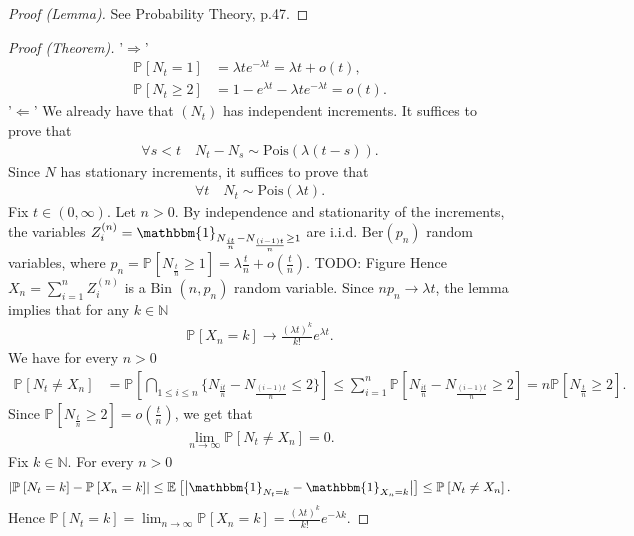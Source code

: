 \begin{proof}[Proof (Lemma)]
	See Probability Theory, p.47.
\end{proof}
\begin{proof}[Proof (Theorem)]
'$\Longrightarrow$' 
\begin{align}
	\mathbb{P}_{} \left[ N_t=1 \right] &= \lambda t e^{-\lambda t} = \lambda t + o(t),\\
	\mathbb{P}_{} \left[ N_t \geq 2 \right] &= 1 - e^{\lambda t} - \lambda t e^{-\lambda t} = o(t).
\end{align}
'$\Longleftarrow$'
We already have that $(N_t)$ has independent increments. It suffices to prove that 
\begin{align}
	\forall s<t \quad N_t - N_s \sim  \textrm{Pois} (\lambda (t-s)).
\end{align}
Since $N$ has stationary increments, it suffices to prove that
\begin{align}
	\forall t \quad N_t \sim  \textrm{Pois} (\lambda t).
\end{align}
Fix $t\in(0,\infty )$. Let $n> 0$. By independence and stationarity of the increments, the variables $Z_i^{(n)}=\mathbbm{1}_{N_{\frac{it}{n}}- N_{\frac{(i-1)t}{n}}\geq 1} $ are i.i.d. $ \textrm{Ber}(p_n)$ random variables, where $p_n = \mathbb{P}_{} \left[ N_{\frac{t}{n}}\geq 1 \right] = \lambda \frac{t}{n} + o\left(\frac{t}{n}\right)$. 
{\color{blue}TODO: Figure}
Hence $X_n = \sum_{i=1}^{n} Z_i^{(n)}$ is a $ \textrm{Bin } (n, p_n)$ random variable. Since $np_n \to \lambda t$, the lemma implies that for any $k \in \mathbb{N}$ 
\begin{align}
	\mathbb{P}_{} \left[ X_n =k \right] \to \frac{(\lambda t)^{k}}{k!}e^{\lambda t}.
\end{align}
We have for every $n> 0$ 
\begin{align}
	\mathbb{P}_{} \left[ N_t \neq X_n \right] &= \mathbb{P}_{} \left[ \bigcap_{1\leq i \leq n} \{ N_{\frac{it}{n}} - N_{\frac{(i-1)t}{n}}\leq 2\} \right] \leq \sum_{i=1}^{n} \mathbb{P}_{} \left[ N_{\frac{it}{n}} - N_{\frac{(i-1)t}{n}} \geq 2 \right] = n \mathbb{P}_{} \left[ N_{\frac{t}{n}}\geq 2 \right].
\end{align}
Since $\mathbb{P}_{} \left[ N_{\frac{t}{n}}\geq 2 \right] = o\left( \frac{t}{n}\right) $, we get that 
\begin{align}
	\lim_{n\to \infty }\mathbb{P}_{} \left[ N_t \neq X_n \right] =0.	
\end{align}
Fix $k\in \mathbb{N}$. For every $n> 0$ 
\begin{align}
	\left| \mathbb{P}_{} \left[ N_t =k \right] - \mathbb{P}_{} \left[ X_n =k \right] \right| \leq \mathbb{E}_{} \left[ \left| \mathbbm{1}_{N_t =k} - \mathbbm{1}_{X_n=k} \right| \right] \leq \mathbb{P}_{} \left[ N_t \neq X_n \right] .
\end{align}
Hence $\mathbb{P}_{} \left[ N_t =k \right] = \lim_{n\to\infty }\mathbb{P}_{} \left[ X_n = k \right] = \frac{(\lambda t)^{k}}{k!}e^{-\lambda k}$.
\end{proof}


